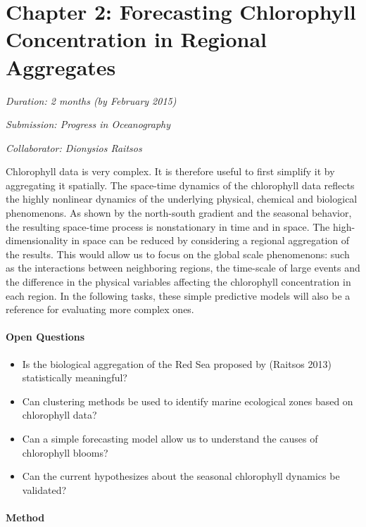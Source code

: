 \section{Chapter 2: Forecasting Chlorophyll Concentration in Regional Aggregates}

\noindent
\emph{Duration: 2 months (by February 2015)}

\noindent
\emph{Submission: Progress in Oceanography}

\noindent
\emph{Collaborator: Dionysios Raitsos}

Chlorophyll data is very complex. It is therefore useful to first simplify it by aggregating it spatially. The space-time dynamics of the chlorophyll data reflects the highly nonlinear dynamics of the underlying physical, chemical and biological phenomenons. As shown by the north-south gradient and the seasonal behavior, the resulting space-time process is nonstationary in time and in space. The high-dimensionality in space can be reduced by considering a regional aggregation of the results. This would allow us to focus on the global scale phenomenons: such as the interactions between neighboring regions, the time-scale of large events and the difference in the physical variables affecting the chlorophyll concentration in each region. In the following tasks, these simple predictive models will also be a reference for evaluating more complex ones. 

\paragraph{Open Questions}

\begin{itemize}
\item Is the biological aggregation of the Red Sea proposed by (Raitsos 2013) statistically meaningful?
\item Can clustering methods be used to identify marine ecological zones based on chlorophyll data?
\item Can a simple forecasting model allow us to understand the causes of chlorophyll blooms?
\item Can the current hypothesizes about the seasonal chlorophyll dynamics be validated?
\end{itemize}

\paragraph{Method}

